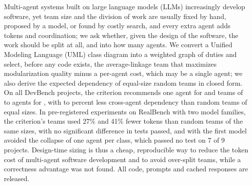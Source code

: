 Multi-agent systems built on large language models (LLMs) increasingly develop software, yet team size and the division of work are usually fixed by hand, proposed by a model, or found by costly search, and every extra agent adds tokens and coordination; we ask whether, given the design of the software, the work should be split at all, and into how many agents. We convert a Unified Modeling Language (UML) class diagram into a weighted graph of duties and select, before any code exists, the average-linkage team that maximizes modularization quality minus a per-agent cost, which may be a single agent; we also derive the expected dependency of equal-size random teams in closed form. On all \NProjects DevBench projects, the criterion recommends one agent for \NSingle and teams of \KMin to \KMax agents for \NMulti, with \CutRedMin to \CutRedMax percent less cross-agent dependency than random teams of equal sizes. In pre-registered experiments on RealBench with two model families, the criterion's teams used 27\% and 41\% fewer tokens than random teams of the same sizes, with no significant difference in tests passed, and with the first model avoided the collapse of one agent per class, which passed no test on 7 of 9 projects. Design-time sizing is thus a cheap, reproducible way to reduce the token cost of multi-agent software development and to avoid over-split teams, while a correctness advantage was not found. All code, prompts and cached responses are released.
